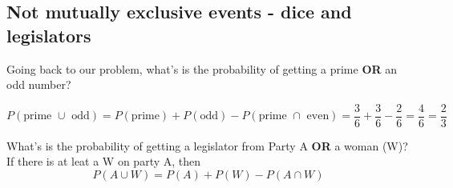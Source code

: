 \documentclass[11pt]{article}
\begin{document}
	\subsection*{Not mutually exclusive events - dice and legislators}
	Going back to our problem, what's is the probability of getting a prime \textbf{OR} an odd number?
	
	\[P(\text{prime }\cup\text{ odd}) = P(\text{prime}) + P(\text{odd}) - P(\text{prime }\cap\text{ even}) 
	= \frac{3}{6} + \frac{3}{6} - \frac{2}{6} = \frac{4}{6} = \frac{2}{3}\]
	
	What's is the probability of getting a legislator from Party A \textbf{OR} a woman (W)?\\
	
	If there is at leat a W on party A, then
	\[P(A \cup W) = P(A) + P(W) - P(A \cap W)\]
\end{document}
